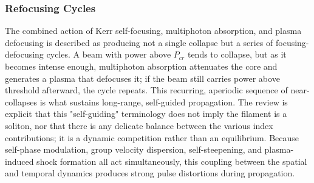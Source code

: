 \documentclass[11pt,a4paper]{article}
\begin{document}
\subsubsection{Refocusing Cycles}
The combined action of Kerr self-focusing, multiphoton absorption, and plasma defocusing is described as producing not a single collapse but a series of focusing-defocusing cycles. A beam with power above $P_{cr}$ tends to collapse, but as it becomes intense enough, multiphoton absorption attenuates the core and generates a plasma that defocuses it; if the beam still carries power above threshold afterward, the cycle repeats. This recurring, aperiodic sequence of near-collapses is what sustains long-range, self-guided propagation. The review is explicit that this "self-guiding" terminology does not imply the filament is a soliton, nor that there is any delicate balance between the various index contributions; it is a dynamic competition rather than an equilibrium. Because self-phase modulation, group velocity dispersion, self-steepening, and plasma-induced shock formation all act simultaneously, this coupling between the spatial and temporal dynamics produces strong pulse distortions during propagation.
\end{document}
